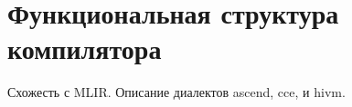 \section{Функциональная структура компилятора}
\label{sec:Chapter8} 

Схожесть с MLIR. Описание диалектов ascend, cce, и hivm.

\newpage
